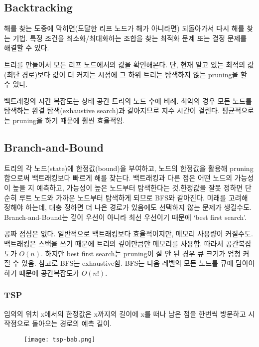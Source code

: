 \subsection{Backtracking}

해를 찾는 도중에 막히면(도달한 리프 노드가 해가 아니라면) 되돌아가서 다시 해를 찾는 기법. 특정 조건을 최소화/최대화하는 조합을 찾는 최적화 문제 또는 결정 문제를 해결할 수 있다.

트리를 만들어서 모든 리프 노드에서의 값을 확인해본다. 단, 현재 알고 있는 최적의 값(최단 경로)보다 값이 더 커지는 시점에 그 하위 트리는 탐색하지 않는 pruning을 할 수 있다.

백트래킹의 시간 복잡도는 상태 공간 트리의 노드 수에 비례. 최악의 경우 모든 노드를 탐색하는 완결 탐색(exhaustive search)과 같아지므로 지수 시간이 걸린다. 평균적으로는 pruning을 하기 때문에 훨씬 효율적임.

\subsection{Branch-and-Bound}

트리의 각 노드(state)에 한정값(bound)을 부여하고, 노드의 한정값을 활용해 pruning함으로써 백트래킹보다 빠르게 해를 찾는다. 백트래킹과 다른 점은 어떤 노드의 가능성이 높을 지 예측하고, 가능성이 높은 노드부터 탐색한다는 것.한정값을 잘못 정하면 단순히 루트 노드와 가까운 노드부터 탐색하게 되므로 BFS와 같아진다. 미래를 고려해 정해야 하는데, 대충 정하면 더 나은 경로가 있음에도 선택하지 않는 문제가 생길수도. Branch-and-Bound는 깊이 우선이 아니라 최선 우선이기 때문에 `best first search'.

공짜 점심은 없다. 일반적으로 백트래킹보다 효율적이지만, 메모리 사용량이 커질수도. 백트래킹은 스택을 쓰기 때문에 트리의 깊이만큼만 메모리를 사용함. 따라서 공간복잡도가 $O(n)$. 하지만 best first search는 pruning이 잘 안 된 경우 큐 크기가 엄청 커질 수 있음. 참고로 BFS는 exhaustive함. BFS는 다음 레벨의 모든 노드를 큐에 담아야 하기 때문에 공간복잡도가 $O(n!)$.

\subsubsection{TSP}

임의의 위치 x에서의 한정값은 x까지의 길이에 x를 떠나 남은 점을 한번씩 방문하고 시작점으로 돌아오는 경로의 예측 길이.

\begin{figure}[h]
  \centering
  \texttt{[image: tsp-bab.png]}
\end{figure}

